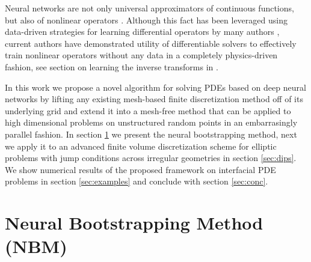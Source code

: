 \documentclass{elsarticle}
\begin{document}
Neural networks are not only universal approximators of continuous functions, but also of nonlinear operators \cite{chen1995universal}. Although this fact has been leveraged using data-driven strategies for learning differential operators by many authors \cite{lu2019deeponet,bhattacharya2020model,li2020neural,li2020fourier}, current authors have demonstrated utility of differentiable solvers to effectively train nonlinear operators without any data in a completely physics-driven fashion, see section on learning the inverse transforms in \cite{pakravan2021solving}.


 




In this work we propose a novel algorithm for solving PDEs based on deep neural networks by lifting any existing mesh-based finite discretization method off of its underlying grid and extend it into a mesh-free method that can be applied to high dimensional problems on unstructured random points in an embarrasingly parallel fashion. In section \ref{sec:nbm} we present the neural bootstrapping method, next we apply it to an advanced finite volume discretization scheme for elliptic problems with jump conditions across irregular geometries in section \ref{sec:dips}. We show numerical results of the proposed framework on interfacial PDE problems in section \ref{sec:examples} and conclude with section \ref{sec:conc}.




\section{Neural Bootstrapping Method (NBM)} \label{sec:nbm}
\end{document}
